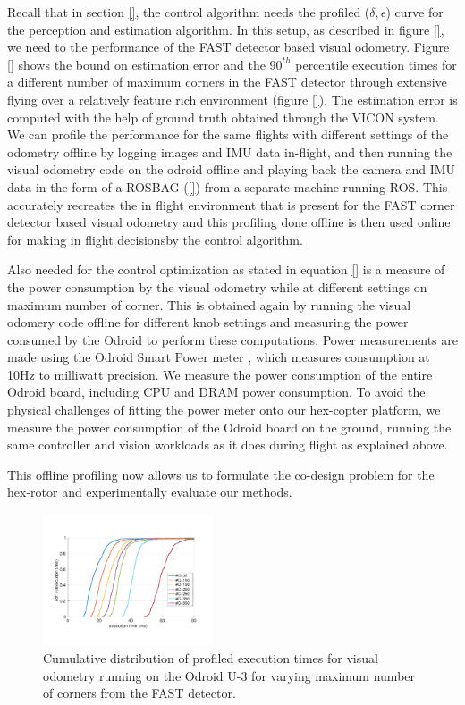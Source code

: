 Recall that in section \ref{}, the control algorithm needs the profiled ($\delta,\epsilon$) curve for the perception and estimation algorithm. In this setup, as described in figure \ref{}, we need to the performance of the FAST detector based visual odometry. Figure \ref{} shows the bound on estimation error and the $90^{th}$ percentile execution times for a different number of maximum corners in the FAST detector through extensive flying over a relatively feature rich environment (figure \ref{}). The estimation error is computed with the help of ground truth obtained through the VICON system. We can profile the performance for the same flights with different settings of the odometry offline by logging images and IMU data in-flight, and then running the visual odometry code on the odroid offline and playing back the camera and IMU data in the form of a ROSBAG (\ref{}) from a separate machine running ROS. 
This accurately recreates the in flight environment that is present for the FAST corner detector based visual odometry and this profiling done offline is then used online for making in flight decisionsby the control algorithm.

Also needed for the control optimization as stated in equation \ref{} is a measure of the power consumption by the visual odometry while at different settings on maximum number of corner. This is obtained again by running the visual odomery code offline for different knob settings and measuring the power consumed by the Odroid to perform these computations. Power measurements are made using the Odroid Smart Power meter \cite{OdroidSmartPower}, which measures consumption at 10Hz to milliwatt precision. We measure the power consumption of the entire Odroid board, including CPU and DRAM power consumption. To avoid the physical challenges of fitting the power meter onto our hex-copter platform, we measure the power consumption of the Odroid board on the ground, running the same controller and vision workloads as it does during flight as explained above.

This offline profiling now allows us to formulate the co-design problem for the hex-rotor and experimentally evaluate our methods.




\begin{figure}[htbp]
  \centering
  \includegraphics[width=0.45\textwidth]{figures/time_ecdf_millisec.pdf}
  \caption{Cumulative distribution of profiled execution times for visual odometry running on the Odroid U-3 for varying maximum number of corners from the FAST detector.}
\end{figure}

